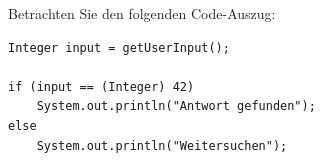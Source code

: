 \documentclass[11pt]{exam} %
\newcommand{\code}[1]{\texttt|#1|}
\newcommand{\fillinline}[1]{\ifprintanswers\fillin[\code{#1}][3cm]\fi\xrfill[-1pt]{0.2mm}}
\newcommand{\fillinlinexl}[1]{\ifprintanswers\fillin[\code{#1}][9cm]\fi\xrfill[-1pt]{0.2mm}}
\begin{document}
\begin{questions}
\filbreak
\question Betrachten Sie den folgenden Code-Auszug:
\begin{verbatim}
Integer input = getUserInput();

if (input == (Integer) 42)
	System.out.println("Antwort gefunden");
else
	System.out.println("Weitersuchen");
	

\end{verbatim}
\end{questions}
\end{document}
